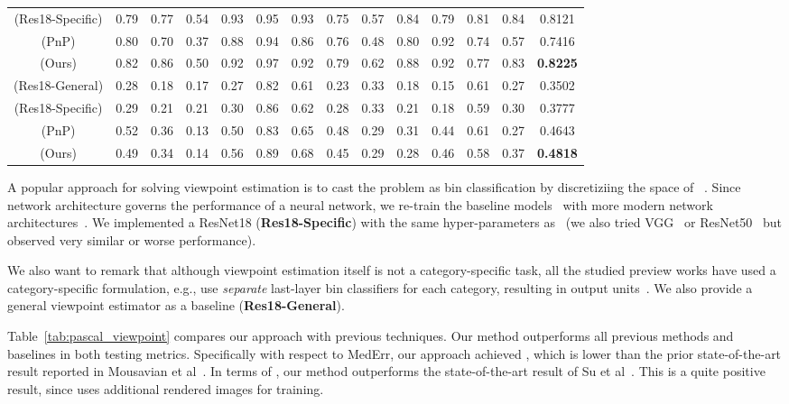 \documentclass[runningheads]{llncs}
\begin{document}
\begin{table*}[t]
{\begin{tabular}{c|cccccccccccc|c}
(Res18-Specific)& 0.79& 0.77 & 0.54 & 0.93 & 0.95 & 0.93 & 0.75 & 0.57 & 0.84 & 0.79 & 0.81 & 0.84 & 0.8121 \\
(PnP)& 0.80 & 0.70 & 0.37 & 0.88 & 0.94 & 0.86 & 0.76 & 0.48 & 0.80 & 0.92 & 0.74 & 0.57 & 0.7416  \\
(Ours)& 0.82& 0.86 & 0.50 & 0.92 & 0.97 & 0.92 & 0.79 & 0.62 & 0.88 & 0.92 & 0.77 & 0.83 & {\bf 0.8225}  \\
\hline
(Res18-General)& 0.28 & 0.18 & 0.17 & 0.27 & 0.82 & 0.61 & 0.23 & 0.33 & 0.18 & 0.15 & 0.61 & 0.27 & 0.3502 \\
(Res18-Specific)& 0.29& 0.21 & 0.21 & 0.30 & 0.86 & 0.62 & 0.28 & 0.33 & 0.21 & 0.18 & 0.59 & 0.30 & 0.3777 \\
(PnP)& 0.52 & 0.36 & 0.13 & 0.50 & 0.83 & 0.65 & 0.48 & 0.29 & 0.31 & 0.44 & 0.61 & 0.27 & 0.4643\\
(Ours)& 0.49& 0.34 & 0.14 & 0.56 & 0.89 & 0.68 & 0.45 & 0.29 & 0.28 & 0.46 & 0.58 & 0.37 & {\bf 0.4818}\\
\hline
\end{tabular}
}
\caption{Viewpoint Estimation on Pascal3D+~\cite{xiang2014beyond}. We compare our results with the state-of-the-arts and baselines. The results are shown in Median Error (lower better) and Accuracy (higher better).}
\label{tab:pascal_viewpoint}
\end{table*}

A popular approach for solving viewpoint estimation is to cast the problem as bin classification by discretiziing the space of ~\cite{tulsiani2015viewpoints,mousavian20173d,su2015render,mahendran2017joint}. Since network architecture governs the performance of a neural network, we re-train the baseline models~\cite{tulsiani2015viewpoints} with more modern network architectures~\cite{he2016deep}.
We implemented a ResNet18 (\textbf{Res18-Specific}) with the same hyper-parameters as~\cite{tulsiani2015viewpoints} (we also tried VGG~\cite{simonyan2014very} or ResNet50~\cite{he2016deep} but observed very similar or worse performance).

We also want to remark that although viewpoint estimation itself is not a category-specific task, all the studied preview works have used a category-specific formulation, e.g., use \emph{separate} last-layer bin classifiers for each category, resulting in  output units~\cite{tulsiani2015pose}. 
We also provide a general  viewpoint estimator as a baseline (\textbf{Res18-General}).

Table~\ref{tab:pascal_viewpoint} compares our approach with previous techniques. Our method outperforms all previous methods and baselines in both testing metrics. Specifically with respect to MedErr, our approach achieved , which is lower than the prior state-of-the-art result reported in Mousavian et al~\cite{mousavian20173d}. 
In terms of , our method outperforms the state-of-the-art result of Su et al~\cite{su2015render}. 
This is a quite positive result, since \cite{su2015render} uses additional rendered images for training.
\end{document}
